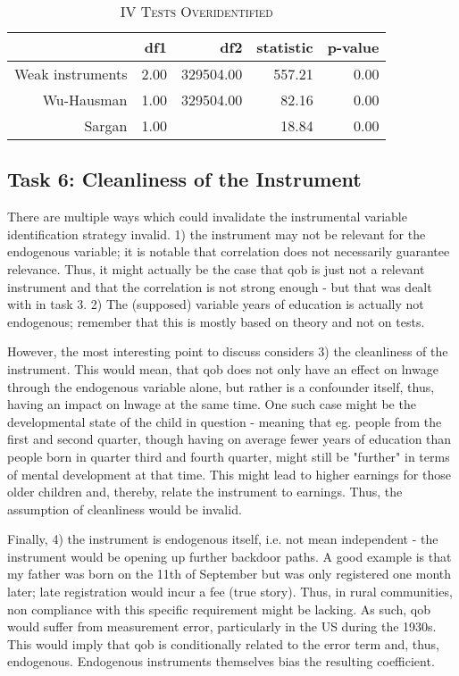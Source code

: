 \documentclass[a4paper]{article}
\begin{document}
\begin{table}[ht]
\captionsetup{font=small, justification=centering,singlelinecheck=false}
\caption{\textsc{IV Tests Overidentified}}
\centering
\begin{tabular}{rrrrr}
  \hline
 & df1 & df2 & statistic & p-value \\ 
  \hline
Weak instruments & 2.00 & 329504.00 & 557.21 & 0.00 \\ 
  Wu-Hausman & 1.00 & 329504.00 & 82.16 & 0.00 \\ 
  Sargan & 1.00 &  & 18.84 & 0.00 \\ 
   \hline
\end{tabular}
\end{table}

\subsection{Task 6: Cleanliness of the Instrument}
There are multiple ways which could invalidate the instrumental variable identification strategy invalid. 1) the instrument may not be relevant for the endogenous variable; it is notable that correlation does not necessarily guarantee relevance. Thus, it might actually be the case that qob is just not a relevant instrument and that the correlation is not strong enough - but that was dealt with in task 3. 2) The (supposed) variable years of education is actually not endogenous; remember that this is mostly based on theory and not on tests. 

However, the most interesting point to discuss considers 3) the cleanliness of the instrument. This would mean, that qob does not only have an effect on lnwage through the endogenous variable alone, but rather is a confounder itself, thus, having an impact on lnwage at the same time. One such case might be the developmental state of the child in question - meaning that eg. people from the first and second quarter, though having on average fewer years of education than people born in quarter third and fourth quarter, might still be "further" in terms of mental development at that time. This might lead to higher earnings for those older children and, thereby, relate the instrument to earnings. Thus, the assumption of cleanliness would be invalid.

Finally, 4) the instrument is endogenous itself, i.e. not mean independent - the instrument would be opening up further backdoor paths. A good example is that my father was born on the 11th of September but was only registered one month later; late registration would incur a fee (true story). Thus, in rural communities, non compliance with this specific requirement might be lacking. As such, qob would suffer from measurement error, particularly in the US during the 1930s. This would imply that qob is conditionally related to the error term and, thus, endogenous. Endogenous instruments themselves bias the resulting coefficient. 
\end{document}
